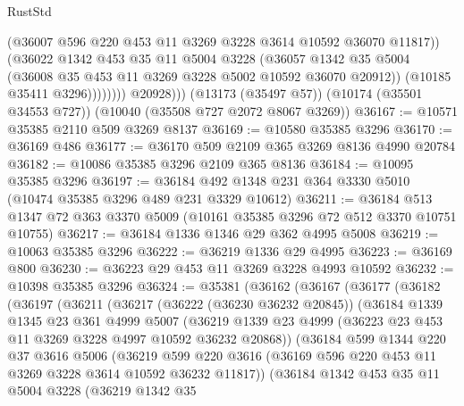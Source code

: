 \begin{lexlean}{RustStd}
\begin{coremodule}
                        (@36007 @596 @220 @453 @11 @3269 @3228 @3614 @10592 @36070 @11817))
                      (@36022
                        @1342
                        @453
                        @35
                        @11
                        @5004
                        @3228
                        (@36057
                          @1342
                          @35
                          @5004
                          (@36008 @35 @453 @11 @3269 @3228 @5002 @10592 @36070 @20912))
                        (@10185 @35411 @3296))))))))
          @20928)))
    (@13173 (@35497 @57))
    (@10174 (@35501 @34553 @727))
    (@10040 (@35508 @727 @2072 @8067 @3269))
@36167 := @10571 @35385 @2110 @509 @3269 @8137
@36169 := @10580 @35385 @3296
@36170 := @36169 @486
@36177 := @36170 @509 @2109 @365 @3269 @8136 @4990 @20784
@36182 := @10086 @35385 @3296 @2109 @365 @8136
@36184 := @10095 @35385 @3296
@36197 := @36184 @492 @1348 @231 @364 @3330 @5010 (@10474 @35385 @3296 @489 @231 @3329 @10612)
@36211 := @36184 @513 @1347 @72 @363 @3370 @5009 (@10161 @35385 @3296 @72 @512 @3370 @10751 @10755)
@36217 := @36184 @1336 @1346 @29 @362 @4995 @5008
@36219 := @10063 @35385 @3296
@36222 := @36219 @1336 @29 @4995
@36223 := @36169 @800
@36230 := @36223 @29 @453 @11 @3269 @3228 @4993 @10592
@36232 := @10398 @35385 @3296
@36324 := @35381
    (@36162
      (@36167
        (@36177
          (@36182
            (@36197
              (@36211
                (@36217
                  (@36222 (@36230 @36232 @20845))
                  (@36184
                    @1339
                    @1345
                    @23
                    @361
                    @4999
                    @5007
                    (@36219
                      @1339
                      @23
                      @4999
                      (@36223 @23 @453 @11 @3269 @3228 @4997 @10592 @36232 @20868))
                    (@36184
                      @599
                      @1344
                      @220
                      @37
                      @3616
                      @5006
                      (@36219
                        @599
                        @220
                        @3616
                        (@36169 @596 @220 @453 @11 @3269 @3228 @3614 @10592 @36232 @11817))
                      (@36184
                        @1342
                        @453
                        @35
                        @11
                        @5004
                        @3228
                        (@36219
                          @1342
                          @35

\end{coremodule}
\end{lexlean}
